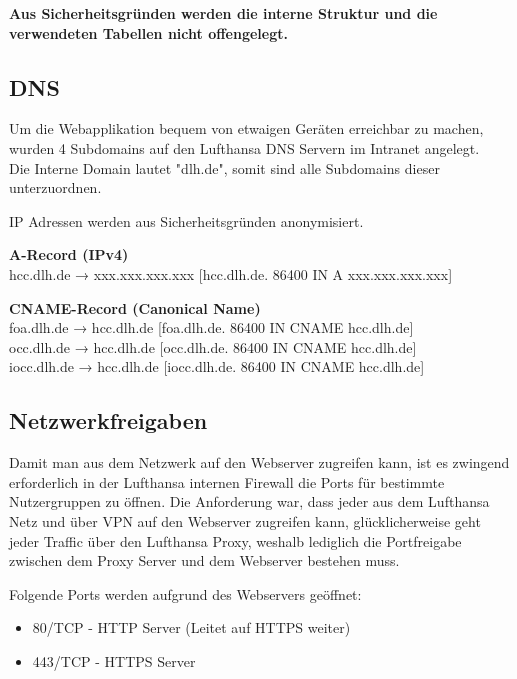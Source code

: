 	{
		\noindent
		\textbf{Aus Sicherheitsgründen werden die interne Struktur und die verwendeten Tabellen nicht offengelegt.}
	}

	\subsection{DNS}

	{
		\noindent
		Um die Webapplikation bequem von etwaigen Geräten erreichbar zu machen, wurden 4 Subdomains auf den Lufthansa DNS Servern im Intranet angelegt.\\
		Die Interne Domain lautet "dlh.de", somit sind alle Subdomains dieser unterzuordnen.	
	}

	{
		\noindent
		IP Adressen werden aus Sicherheitsgründen anonymisiert.
	}
	
	\vspace{16pt}

	{
		\noindent
		\textbf{A-Record (IPv4)}\\
		hcc.dlh.de → xxx.xxx.xxx.xxx [hcc.dlh.de. 86400 IN A xxx.xxx.xxx.xxx]
	}

	\vspace{8pt}

	{
		\noindent
		\textbf{CNAME-Record (Canonical Name)}\\
		foa.dlh.de → hcc.dlh.de [foa.dlh.de. 86400 IN CNAME hcc.dlh.de]\\
		occ.dlh.de → hcc.dlh.de [occ.dlh.de. 86400 IN CNAME hcc.dlh.de]\\
		iocc.dlh.de → hcc.dlh.de [iocc.dlh.de. 86400 IN CNAME hcc.dlh.de]
	}
	

	

	\subsection{Netzwerkfreigaben}
	Damit man aus dem Netzwerk auf den Webserver zugreifen kann, ist es zwingend erforderlich in der Lufthansa internen Firewall die Ports für bestimmte Nutzergruppen zu öffnen.
	Die Anforderung war, dass jeder aus dem Lufthansa Netz und über VPN auf den Webserver zugreifen kann, glücklicherweise geht jeder Traffic über den Lufthansa Proxy, weshalb lediglich die Portfreigabe zwischen dem Proxy Server und dem Webserver bestehen muss.
	
	Folgende Ports werden aufgrund des Webservers geöffnet:

	\begin{itemize}
		\item 80/TCP - HTTP Server (Leitet auf HTTPS weiter)
		\item 443/TCP - HTTPS Server
	\end{itemize}